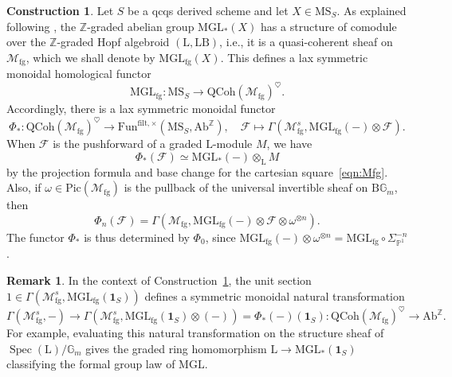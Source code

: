 \documentclass{amsart}
\numberwithin{equation}{section}
\theoremstyle{plain}
\theoremstyle{definition}
\newtheorem{construction}[equation]{Construction}
\newtheorem{remark}[equation]{Remark}
\let\scr=\mathcal
\let\bb=\mathbb
\let\rm=\mathrm
\def\Z{\bb Z}
\def\P{\bb P}
\def\1{\mathbf 1}
\def\G{\mathbb G}
\def\ph{\mathord-}
\def\L{\mathrm{L}{}}
\def\LB{\mathrm{LB}{}}
\DeclareMathOperator{\Spec}{Spec}
\def\Pic{\mathrm{Pic}}
\def\QCoh{\mathrm{QCoh}{}}
\def\MGL{\mathrm{MGL}}
\def\MS{\mathrm{MS}}
\def\Ab{\mathrm{A}\mathrm{b}}
\def\Fun{\mathrm{Fun}}
\def\fg{\mathrm{fg}}
\let\heart=\heartsuit
\begin{document}
\begin{construction}\label{ctr:Phi-star}
Let $S$ be a qcqs derived scheme and let $X\in\MS_S$. As explained following \cite[Lemma 8.7]{AHI}, the $\Z$-graded abelian group $\MGL_*(X)$ has a structure of comodule over the $\Z$-graded Hopf algebroid $(\L,\LB)$, i.e., it is a quasi-coherent sheaf on $\scr M_\mathrm{fg}$, which we shall denote by $\MGL_\mathrm{fg}(X)$. This defines a lax symmetric monoidal homological functor
\[
\MGL_\mathrm{fg}\colon \MS_S \to \QCoh(\scr M_\mathrm{fg})^\heart.
\]
Accordingly, there is a lax symmetric monoidal functor
\[
\Phi_*\colon \QCoh(\scr M_\mathrm{fg})^\heart \to \Fun^{\mathrm{filt},\times}(\MS_S,\Ab^\Z), \quad \scr F \mapsto \Gamma(\scr M_\mathrm{fg}^s,\MGL_\mathrm{fg}(\ph)\otimes \scr F).
\]
When $\scr F$ is the pushforward of a graded $\L$-module $M$, we have
\begin{equation*}\label{eqn:MGL-tensor}
\Phi_*(\scr F) \simeq \MGL_*(\ph)\otimes_{\L} M
\end{equation*}
by the projection formula and base change for the cartesian square~\eqref{eqn:Mfg}. Also, if $\omega\in \Pic(\scr M_\mathrm{fg})$ is the pullback of the universal invertible sheaf on $\rm B\G_m$, then
\[
\Phi_n(\scr F) = \Gamma(\scr M_\mathrm{fg},\MGL_\mathrm{fg}(\ph)\otimes \scr F\otimes\omega^{\otimes n}).
\]
The functor $\Phi_*$ is thus determined by $\Phi_0$, since $\MGL_\mathrm{fg}(\ph)\otimes\omega^{\otimes n}=\MGL_\mathrm{fg}\circ \Sigma_{\P^1}^{-n}$.
\end{construction}

\begin{remark}\label{rmk:topological-to-motivic}
	In the context of Construction~\ref{ctr:Phi-star}, the unit section $1\in \Gamma(\scr M_\fg^s,\MGL_\fg(\1_S))$ defines a symmetric monoidal natural transformation 
	\[
	\Gamma(\scr M_\fg^s,\ph)\to \Gamma(\scr M_\fg^s,\MGL_\fg(\1_S)\otimes (\ph)) = \Phi_*(\ph)(\1_S)\colon \QCoh(\scr M_\mathrm{fg})^\heart\to \Ab^\Z.
	\]
	For example, evaluating this natural transformation on the structure sheaf of $\Spec(\L)/\G_m$ gives the graded ring homomorphism $\L\to\MGL_*(\1_S)$ classifying the formal group law of $\MGL$.
\end{remark}
\end{document}
